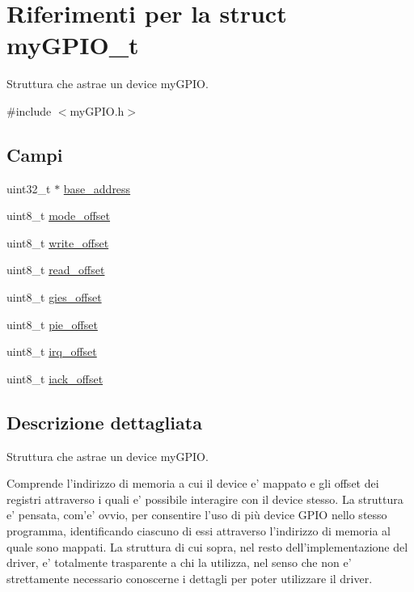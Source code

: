 \hypertarget{structmy_g_p_i_o__t}{\section{Riferimenti per la struct my\+G\+P\+I\+O\+\_\+t}
\label{structmy_g_p_i_o__t}
}


Struttura che astrae un device my\+G\+P\+I\+O.  




{\ttfamily \#include $<$my\+G\+P\+I\+O.\+h$>$}

\subsection*{Campi}
\begin{DoxyCompactItemize}
\item 
uint32\+\_\+t $\ast$ \hyperlink{structmy_g_p_i_o__t_a79c591d5fa42efdf86abd98347fece90}{base\+\_\+address}
\item 
uint8\+\_\+t \hyperlink{structmy_g_p_i_o__t_ad21272e5293d7c1e7ccafe35a2e129d1}{mode\+\_\+offset}
\item 
uint8\+\_\+t \hyperlink{structmy_g_p_i_o__t_abb65e5db6d4ad365a7c48d00e4af1f78}{write\+\_\+offset}
\item 
uint8\+\_\+t \hyperlink{structmy_g_p_i_o__t_ab65acde67dc46f1d163e2ee468420b48}{read\+\_\+offset}
\item 
uint8\+\_\+t \hyperlink{structmy_g_p_i_o__t_a396df54cd6cf921c00ea28779db8de42}{gies\+\_\+offset}
\item 
uint8\+\_\+t \hyperlink{structmy_g_p_i_o__t_ae5f1d610c87917b9dd6fbb5af534faf0}{pie\+\_\+offset}
\item 
uint8\+\_\+t \hyperlink{structmy_g_p_i_o__t_a75a81dd8e3333cb69aa4938d82b5e433}{irq\+\_\+offset}
\item 
uint8\+\_\+t \hyperlink{structmy_g_p_i_o__t_a89b56f53628a6e25587385a964248793}{iack\+\_\+offset}
\end{DoxyCompactItemize}


\subsection{Descrizione dettagliata}
Struttura che astrae un device my\+G\+P\+I\+O. 

Comprende l'indirizzo di memoria a cui il device e' mappato e gli offset dei registri attraverso i quali e' possibile interagire con il device stesso. La struttura e' pensata, com'e' ovvio, per consentire l'uso di più device G\+P\+I\+O nello stesso programma, identificando ciascuno di essi attraverso l'indirizzo di memoria al quale sono mappati. La struttura di cui sopra, nel resto dell'implementazione del driver, e' totalmente trasparente a chi la utilizza, nel senso che non e' strettamente necessario conoscerne i dettagli per poter utilizzare il driver. 

